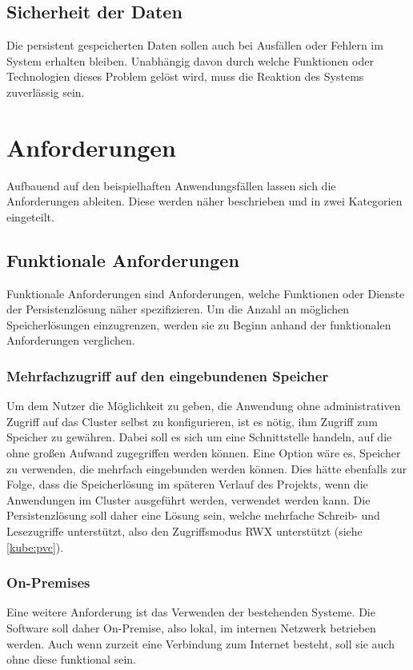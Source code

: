 \subsection{Sicherheit der Daten}
Die persistent gespeicherten Daten sollen auch bei Ausfällen oder Fehlern im System erhalten bleiben. Unabhängig davon durch welche Funktionen oder Technologien dieses Problem gelöst wird, muss die Reaktion des Systems zuverlässig sein.

\section{Anforderungen}
Aufbauend auf den beispielhaften Anwendungsfällen lassen sich die Anforderungen ableiten. Diese werden näher beschrieben und in zwei Kategorien eingeteilt.

\subsection{Funktionale Anforderungen} %
\label{sec:funktionale}
Funktionale Anforderungen sind Anforderungen, welche Funktionen oder Dienste der Persistenzlösung näher spezifizieren. Um die Anzahl an möglichen Speicherlösungen einzugrenzen, werden sie zu Beginn anhand der funktionalen Anforderungen verglichen.

\subsubsection{Mehrfachzugriff auf den eingebundenen Speicher}
Um dem Nutzer die Möglichkeit zu geben, die Anwendung ohne administrativen Zugriff auf das Cluster selbst zu konfigurieren, ist es nötig, ihm Zugriff zum Speicher zu gewähren. Dabei soll es sich um eine Schnittstelle handeln, auf die ohne großen Aufwand zugegriffen werden können. Eine Option wäre es, Speicher zu verwenden, die mehrfach eingebunden werden können. Dies hätte ebenfalls zur Folge, dass die Speicherlösung im späteren Verlauf des Projekts, wenn die Anwendungen im Cluster ausgeführt werden, verwendet werden kann. Die Persistenzlösung soll daher eine Lösung sein, welche mehrfache Schreib- und Lesezugriffe unterstützt, also den Zugriffsmodus \ac{RWX} unterstützt (siehe \ref{kube:pvc}).

\subsubsection{On-Premises}
Eine weitere Anforderung ist das Verwenden der bestehenden Systeme. Die Software soll daher On-Premise, also lokal, im internen Netzwerk betrieben werden. Auch wenn zurzeit eine Verbindung zum Internet besteht, soll sie auch ohne diese funktional sein.

